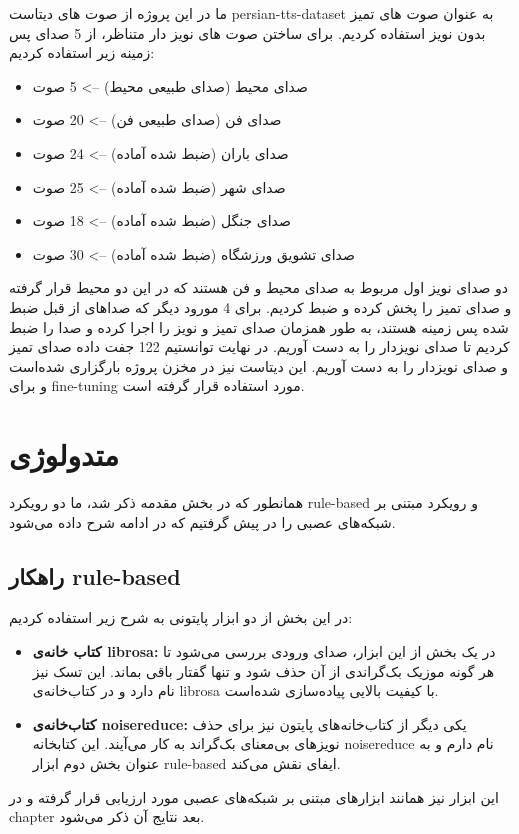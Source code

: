 \documentclass[fleqn]{report}
\begin{document}
ما در این پروژه از صوت های دیتاست persian-tts-dataset به عنوان صوت های تمیز بدون نویز استفاده کردیم. برای ساختن صوت های نویز دار متناظر، از 5 صدای پس زمینه زیر استفاده کردیم:
\begin{itemize}
    \item صدای محیط (صدای طبیعی محیط) --> 5 صوت
    \item صدای فن (صدای طبیعی فن) --> 20 صوت
    \item صدای باران (ضبط شده آماده) --> 24 صوت
    \item صدای شهر (ضبط شده آماده) --> 25 صوت
    \item صدای جنگل (ضبط شده آماده) --> 18 صوت
    \item صدای تشویق ورزشگاه (ضبط شده آماده) --> 30 صوت
\end{itemize}

دو صدای نویز اول مربوط به صدای محیط و فن هستند که در این دو محیط قرار گرفته و صدای تمیز را پخش کرده و ضبط کردیم. برای 4 مورود دیگر که صداهای از قبل ضبط شده پس زمینه هستند، به طور همزمان صدای تمیز و نویز را اجرا کرده و صدا را ضبط کردیم تا صدای نویزدار را به دست آوریم. در نهایت توانستیم 122 جفت داده صدای تمیز و صدای نویزدار را به دست آوریم.
این دیتاست نیز در مخزن پروژه بارگزاری شده‌است و برای fine-tuning مورد استفاده قرار گرفته است.

\chapter{متدولوژی}
همانطور که در بخش مقدمه ذکر شد، ما دو رویکرد rule-based و رویکرد مبتنی بر شبکه‌های عصبی را در پیش گرفتیم که در ادامه شرح داده می‌شود.

\section{راهکار rule-based}
در این بخش از دو ابزار پایتونی به شرح زیر استفاده کردیم:
\begin{itemize}
    \item \textbf{کتاب خانه‌ی librosa:} در یک بخش از این ابزار، صدای ورودی بررسی می‌شود تا هر گونه موزیک بک‌گراندی از آن حذف شود و تنها گفتار باقی بماند. این تسک  نیز نام دارد و در کتاب‌خانه‌ی librosa با کیفیت بالایی پیاده‌سازی شده‌است.
    \item \textbf{کتاب‌خانه‌ی noisereduce:} یکی دیگر از کتاب‌خانه‌های پایتون نیز برای حذف نویز‌های بی‌معنای بک‌گراند به کار می‌آیند. این کتابخانه noisereduce نام دارم و به عنوان بخش دوم ابزار rule-based ایفای نقش می‌کند.
\end{itemize}

این ابزار نیز همانند ابزار‌های مبتنی بر شبکه‌های عصبی مورد ارزیابی قرار گرفته و در chapter بعد نتایج آن ذکر می‌شود.
\end{document}
